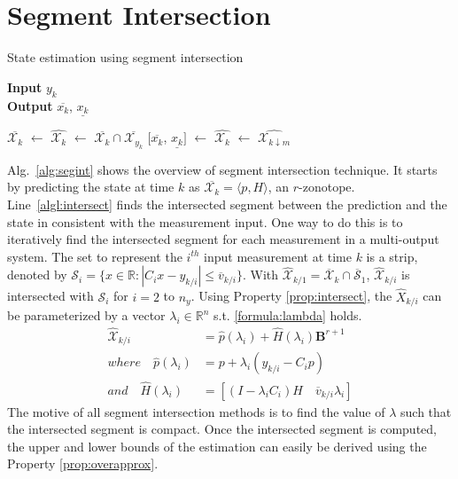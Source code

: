 \section{Segment Intersection} 
\begin{algorithm}[H]
        \caption{State estimation using segment intersection}
        \textbf{Input} $y_k$\\
 		\textbf{Output} $\overline{x_k}$, $\underline{x_k}$
        \begin{algorithmic}[1]
        \State $\overline{\mathcal{X}_k}$ $\gets$ 
        \State $\hat{\mathcal{X}_{k}}$ $\gets$ $\overline{\mathcal{X}_k} \cap \overline{\mathcal{X}_{y_k}}$ \label{algl:intersect}
        \State $[\overline{x_k}$, $\underline{x_k}]$ $\gets$ 
        \State $\hat{\mathcal{X}_{k}}$ $\gets$ $\hat{\mathcal{X}_{k\downarrow m}}$ \label{algl:reduce}
        \end{algorithmic}
        \label{alg:segint}
\end{algorithm}
Alg.~\ref{alg:segint} shows the overview of segment intersection technique. It starts by predicting the state at time $k$ as $\overline{\mathcal{X}_k} = \langle p , H \rangle $, an $r$-zonotope. Line~\ref{algl:intersect} finds the intersected segment between the prediction and the state in consistent with the measurement input. One way to do this is to iteratively find the intersected segment for each measurement in a multi-output system. The set to represent the $i^{th}$ input measurement at time $k$  is a strip, denoted by $\mathscr{S}_i = \{x \in \mathbb{R} : |C_i x - y_{k/i}| \leq \overline{v}_{k/i}\}$. With $\hat{\mathcal{X}}_{k/1} = \overline{\mathcal{X}}_k \cap \overline{\mathscr{S}}_1$, $\hat{\mathcal{X}}_{k/i}$  is intersected with $\mathscr{S}_i$ for $i=2$ to $n_y$. Using Property \ref{prop:intersect}, the $\hat{X}_{k/i}$ can be parameterized by a vector $\lambda_i \in \mathbb{R}^n$ s.t. \eqref{formula:lambda} holds.
\begin{equation}
\label{formula:lambda}
\begin{split}
\mathcal{\hat{X}}_{k/i} &= \hat{p}(\lambda_i) + \hat{H}(\lambda_i)\textbf{B}^{r+1}  \\
where \quad \hat{p}(\lambda_i) &= p+ \lambda_i(y_{k/i} - C_i p)\\
and \quad \hat{H}(\lambda_i) &= [(I- \lambda_i C_i) H \quad \overline{v}_{k/i} \lambda_i ]
\end{split}
\end{equation}
The motive of all segment intersection methods is to find the value of $\lambda$ such that the intersected segment is compact. Once the intersected segment is computed, the upper and lower bounds of the estimation can easily be derived using the Property \ref{prop:overapprox}.

